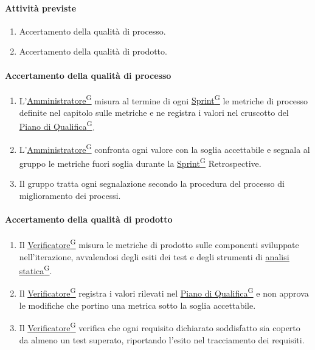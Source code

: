 \documentclass[a4paper,12pt]{article}
\providecommand{\glslink}[2]{\href{https://alittlebyte-19.github.io/Documentazione/glossario.html\#gls-#1}{\underline{#2}\textsuperscript{\scriptsize G}}}
\begin{document}
\paragraph{Attività previste}
\begin{enumerate}
    \item Accertamento della qualità di processo.
    \item Accertamento della qualità di prodotto.
\end{enumerate}

\paragraph{Accertamento della qualità di processo}
\begin{enumerate}
    \item L'\glslink{amministratore}{Amministratore} misura al termine di ogni \glslink{sprint}{Sprint} le metriche di processo definite nel capitolo sulle metriche e ne registra i valori nel cruscotto del \glslink{piano-di-qualifica}{Piano di Qualifica}.
    \item L'\glslink{amministratore}{Amministratore} confronta ogni valore con la soglia accettabile e segnala al gruppo le metriche fuori soglia durante la \glslink{sprint}{Sprint} Retrospective.
    \item Il gruppo tratta ogni segnalazione secondo la procedura del processo di miglioramento dei processi.
\end{enumerate}

\paragraph{Accertamento della qualità di prodotto}
\begin{enumerate}
    \item Il \glslink{verificatore}{Verificatore} misura le metriche di prodotto sulle componenti sviluppate nell'iterazione, avvalendosi degli esiti dei test e degli strumenti di \glslink{analisi-statica}{analisi statica}.
    \item Il \glslink{verificatore}{Verificatore} registra i valori rilevati nel \glslink{piano-di-qualifica}{Piano di Qualifica} e non approva le modifiche che portino una metrica sotto la soglia accettabile.
    \item Il \glslink{verificatore}{Verificatore} verifica che ogni requisito dichiarato soddisfatto sia coperto da almeno un test superato, riportando l'esito nel tracciamento dei requisiti.
\end{enumerate}
\end{document}
